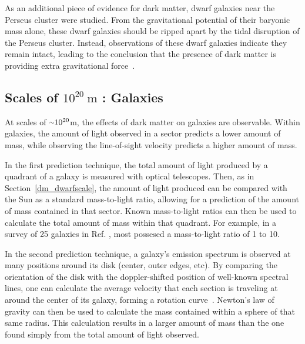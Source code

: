     As an additional piece of evidence for dark matter, dwarf galaxies near the Perseus cluster were studied.
    From the gravitational potential of their baryonic mass alone, these dwarf galaxies should be ripped apart by the tidal disruption of the Perseus cluster.
    Instead, observations of these dwarf galaxies indicate they remain intact, leading to the conclusion that the presence of dark matter is providing extra gravitational force~\cite{Penny2009}.
    
    \FloatBarrier

  \subsection{Scales of $10^{20}\:\text{m}$ : Galaxies}\label{dm_gal}
    At scales of $\nicetilde 10^{20}$m, the effects of dark matter on galaxies are observable.
    Within galaxies, the amount of light observed in a sector predicts a lower amount of mass, while observing the line-of-sight velocity predicts a higher amount of mass.
    
    In the first prediction technique, the total amount of light produced by a quadrant of a galaxy is measured with optical telescopes.
    Then, as in Section~\ref{dm_dwarfscale}, the amount of light produced can be compared with the Sun as a standard mass-to-light ratio, allowing for a prediction of the amount of mass contained in that sector.
    Known mass-to-light ratios can then be used to calculate the total amount of mass within that quadrant.
    For example, in a survey of 25 galaxies in Ref. \cite{galaxy_mass_light_ratio}, most possesed a mass-to-light ratio of 1 to 10.

    In the second prediction technique, a galaxy's emission spectrum is observed at many positions around its disk (center, outer edges, etc).
    By comparing the orientation of the disk with the doppler-shifted position of well-known spectral lines, one can calculate the average velocity that each section is traveling at around the center of its galaxy, forming a rotation curve~\cite{rotation_curve_review, spiral_galaxy_rot_curve, milkyway_dm_evidence}.
    Newton's law of gravity can then be used to calculate the mass contained within a sphere of that same radius.
    This calculation results in a larger amount of mass than the one found simply from the total amount of light observed.
    
